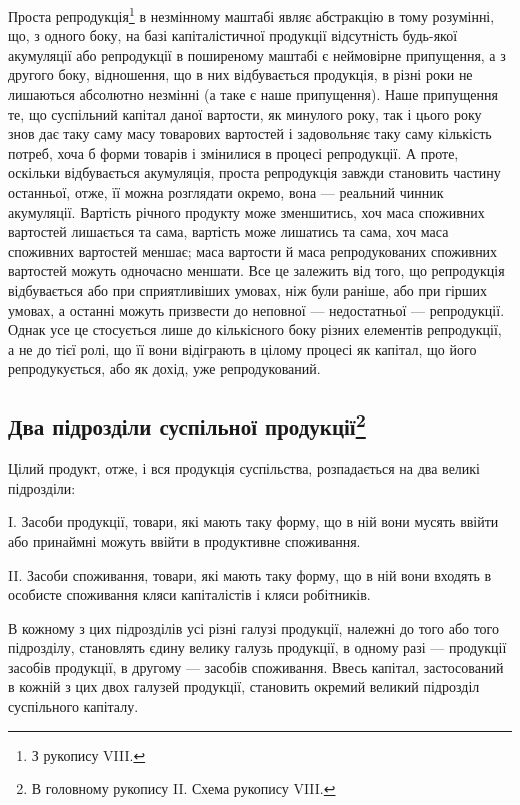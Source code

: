 Проста репродукція\footnote{
З рукопису VIII.
} в незмінному маштабі являє абстракцію в тому
розумінні, що, з одного боку, на базі капіталістичної продукції відсутність
будь-якої акумуляції або репродукції в поширеному маштабі є
неймовірне припущення, а з другого боку, відношення, що в них відбувається
продукція, в різні роки не лишаються абсолютно незмінні (а таке
є наше припущення). Наше припущення те, що суспільний капітал даної
вартости, як минулого року, так і цього року знов дає таку саму масу товарових вартостей і
задовольняє таку саму кількість потреб, хоча б форми товарів і змінилися в процесі репродукції. А
проте, оскільки відбувається акумуляція, проста репродукція завжди становить частину останньої,
отже, її можна розглядати окремо, вона — реальний чинник акумуляції. Вартість річного продукту може
зменшитись, хоч маса споживних вартостей лишається та сама, вартість може лишатись та сама, хоч маса
споживних вартостей меншає; маса вартости й маса репродукованих
споживних вартостей можуть одночасно меншати. Все це залежить
від того, що репродукція відбувається або при сприятливіших умовах,
ніж були раніше, або при гірших умовах, а останні можуть призвести до
неповної — недостатньої — репродукції. Однак усе це стосується лише до
кількісного боку різних елементів репродукції, а не до тієї ролі, що її
вони відіграють в цілому процесі як капітал, що його репродукується,
або як дохід, уже репродукований.

\subsection{Два підрозділи суспільної продукції\footnote{
В головному рукопису II. Схема рукопису VIII.
}}

Цілий продукт, отже, і вся продукція суспільства, розпадається на
два великі підрозділи:

I. Засоби продукції, товари, які мають таку форму, що в ній
вони мусять ввійти або принаймні можуть ввійти в продуктивне споживання.

II. Засоби споживання, товари, які мають таку форму, що в
ній вони входять в особисте споживання кляси капіталістів і кляси робітників.

В кожному з цих підрозділів усі різні галузі продукції, належні до
того або того підрозділу, становлять єдину велику галузь продукції,
в одному разі — продукції засобів продукції, в другому — засобів споживання.
Ввесь капітал, застосований в кожній з цих двох галузей продукції,
становить окремий великий підрозділ суспільного капіталу.

